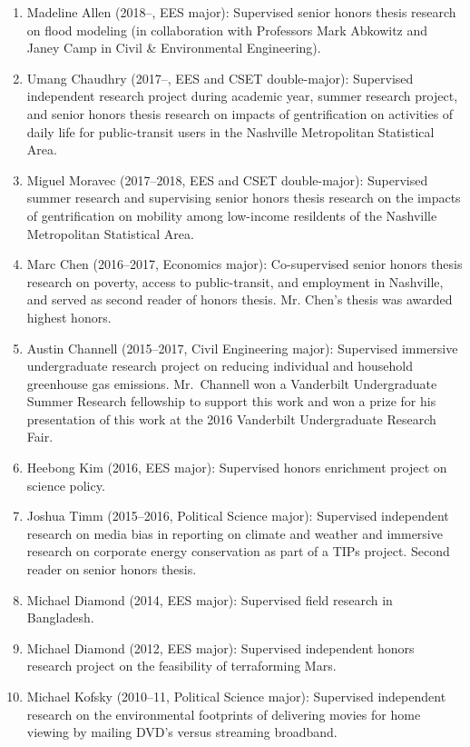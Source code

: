 \documentclass[10pt]{article}
\begin{document}
	\begin{enumerate}
    \item Madeline Allen (2018--, EES major): Supervised senior honors thesis research on flood modeling (in collaboration with Professors Mark Abkowitz and Janey Camp in Civil \& Environmental Engineering).
	\item Umang Chaudhry (2017--, EES and CSET double-major): Supervised independent research project during academic year, summer research project, and senior honors thesis research on impacts of gentrification on activities of daily life
	for public-transit users in the Nashville Metropolitan Statistical Area.
    \item Miguel Moravec (2017--2018, EES and CSET double-major): Supervised summer research and supervising senior honors thesis research on the impacts of gentrification on mobility among low-income resildents of the Nashville Metropolitan Statistical Area.
    \item Marc Chen (2016--2017, Economics major): Co-supervised senior honors thesis research on poverty, access to public-transit, and employment in Nashville, and served as second reader of honors thesis. Mr. Chen's thesis was awarded highest honors.
    \item Austin Channell (2015--2017, Civil Engineering major): Supervised immersive undergraduate research project on reducing individual and household greenhouse gas emissions.
    Mr.~Channell won a Vanderbilt Undergraduate Summer Research fellowship to support this work and won a prize for his presentation of this work at the 2016 Vanderbilt Undergraduate Research Fair.
    \item Heebong Kim (2016, EES major): Supervised honors enrichment project on science policy.
	\item Joshua Timm (2015--2016, Political Science major): Supervised independent research on media bias in reporting on climate and weather and immersive research on corporate energy conservation as part of a TIPs project. Second reader on senior honors thesis.
	\item Michael Diamond (2014, EES major): Supervised field research in Bangladesh.
	\item Michael Diamond (2012, EES major): Supervised independent honors research project on the feasibility of terraforming Mars.
	\item Michael Kofsky (2010--11, Political Science major): Supervised independent research on the environmental footprints of delivering movies for home viewing by mailing DVD's versus streaming broadband.

\end{enumerate}
\end{document}
